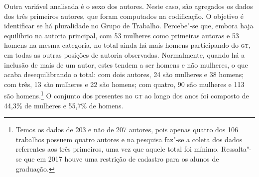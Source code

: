 Outra variável analisada é o sexo dos autores. Neste caso, são
agregados os dados dos três primeiros autores, que foram
computados na codificação. O objetivo é identificar se há pluralidade no
Grupo de Trabalho. Percebe"-se que, embora haja equilíbrio na autoria
principal, com 53 mulheres como primeiras autoras e 53 homens na mesma
categoria, no total ainda há mais homens participando do \textsc{gt}, em todas as
outras posições de autoria observadas. Normalmente, quando há a inclusão
de mais de um autor, estes tendem a ser homens e não mulheres, o que
acaba desequilibrando o total: com dois autores, 24 são mulheres e 38 homens; com três, 13 são mulheres e 22 são homens; com quatro, 90 são mulheres e 113 são homens.\footnote{Temos os dados de 203 e não de 207 autores, pois apenas quatro dos 106 trabalhos possuem quatro autores e na pesquisa faz"-se a coleta dos dados referentes aos três primeiros, uma vez que aquele total foi mínimo. Ressalta"-se que em 2017 houve uma restrição de cadastro para os alunos de graduação.} O conjunto dos presentes no \textsc{gt} ao longo
dos anos foi composto de 44,3\% de mulheres e 55,7\% de homens.

